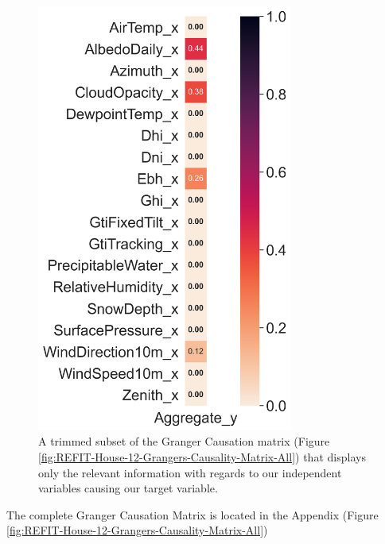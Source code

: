 \begin{figure}[hbt!]
    \centering
    \includegraphics[width=0.75\textwidth]{Images/Chapter 4/REFIT/REFIT-House-12-Grangers-Causality-Matrix-Single.png}
    \caption{A trimmed subset of the Granger Causation matrix (Figure \ref{fig:REFIT-House-12-Grangers-Causality-Matrix-All}) that displays only the relevant information with regards to our independent variables causing our target variable.}
    \label{fig:REFIT-House-12-Grangers-Causality-Matrix-Single}
\end{figure}

\noindent \newline The complete Granger Causation Matrix is located in the Appendix (Figure \ref{fig:REFIT-House-12-Grangers-Causality-Matrix-All})

